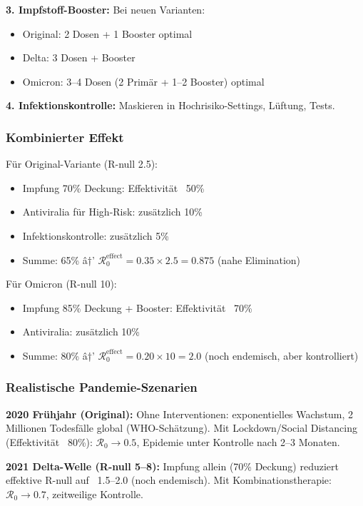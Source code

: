 ﻿\documentclass[a4paper,12pt,twoside]{article}
\theoremstyle{definition}
\begin{document}
\textbf{3. Impfstoff-Booster:} Bei neuen Varianten:
\begin{itemize}
\item Original: 2 Dosen + 1 Booster optimal
\item Delta: 3 Dosen + Booster
\item Omicron: 3--4 Dosen (2 Primär + 1--2 Booster) optimal
\end{itemize}

\textbf{4. Infektionskontrolle:} Maskieren in Hochrisiko-Settings, Lüftung, Tests.

\subsubsection{Kombinierter Effekt}

Für Original-Variante (R-null 2.5):
\begin{itemize}
\item Impfung 70\% Deckung: Effektivität ~50\%
\item Antiviralia für High-Risk: zusätzlich 10\%
\item Infektionskontrolle: zusätzlich 5\%
\item Summe: 65\% â†’ $\mathcal{R}_0^{\text{effect}} = 0.35 \times 2.5 = 0.875$ (nahe Elimination)
\end{itemize}

Für Omicron (R-null 10):
\begin{itemize}
\item Impfung 85\% Deckung + Booster: Effektivität ~70\%
\item Antiviralia: zusätzlich 10\%
\item Summe: 80\% â†’ $\mathcal{R}_0^{\text{effect}} = 0.20 \times 10 = 2.0$ (noch endemisch, aber kontrolliert)
\end{itemize}

\subsubsection{Realistische Pandemie-Szenarien}

\textbf{2020 Frühjahr (Original):} Ohne Interventionen: exponentielles Wachstum, 2 Millionen Todesfälle global (WHO-Schätzung). Mit Lockdown/Social Distancing (Effektivität ~80\%): $\mathcal{R}_0 \to 0.5$, Epidemie unter Kontrolle nach 2--3 Monaten.

\textbf{2021 Delta-Welle (R-null 5--8):} Impfung allein (70\% Deckung) reduziert effektive R-null auf ~1.5--2.0 (noch endemisch). Mit Kombinationstherapie: $\mathcal{R}_0 \to 0.7$, zeitweilige Kontrolle.
\end{document}
